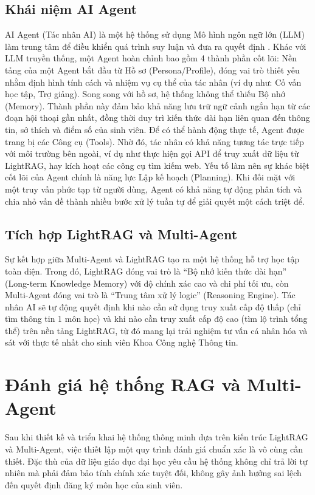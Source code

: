 \subsection{Khái niệm AI Agent}
AI Agent (Tác nhân AI) là một hệ thống sử dụng Mô hình ngôn ngữ lớn (LLM) làm trung tâm để điều khiển quá trình suy luận và đưa ra quyết định \cite{xi2023rise}. Khác với LLM truyền thống, một Agent hoàn chỉnh bao gồm 4 thành phần cốt lõi:
Nền tảng của một Agent bắt đầu từ Hồ sơ (Persona/Profile), đóng vai trò thiết yếu nhằm định hình tính cách và nhiệm vụ cụ thể của tác nhân (ví dụ như: Cố vấn học tập, Trợ giảng).
Song song với hồ sơ, hệ thống không thể thiếu Bộ nhớ (Memory). Thành phần này đảm bảo khả năng lưu trữ ngữ cảnh ngắn hạn từ các đoạn hội thoại gần nhất, đồng thời duy trì kiến thức dài hạn liên quan đến thông tin, sở thích và điểm số của sinh viên.
Để có thể hành động thực tế, Agent được trang bị các Công cụ (Tools). Nhờ đó, tác nhân có khả năng tương tác trực tiếp với môi trường bên ngoài, ví dụ như thực hiện gọi API để truy xuất dữ liệu từ LightRAG, hay kích hoạt các công cụ tìm kiếm web.
Yếu tố làm nên sự khác biệt cốt lõi của Agent chính là năng lực Lập kế hoạch (Planning). Khi đối mặt với một truy vấn phức tạp từ người dùng, Agent có khả năng tự động phân tích và chia nhỏ vấn đề thành nhiều bước xử lý tuần tự để giải quyết một cách triệt để.

\subsection{Tích hợp LightRAG và Multi-Agent}
Sự kết hợp giữa Multi-Agent và LightRAG tạo ra một hệ thống hỗ trợ học tập toàn diện. Trong đó, LightRAG đóng vai trò là ``Bộ nhớ kiến thức dài hạn'' (Long-term Knowledge Memory) với độ chính xác cao và chi phí tối ưu, còn Multi-Agent đóng vai trò là ``Trung tâm xử lý logic'' (Reasoning Engine). Tác nhân AI sẽ tự động quyết định khi nào cần sử dụng truy xuất cấp độ thấp (chỉ tìm thông tin 1 môn học) và khi nào cần truy xuất cấp độ cao (tìm lộ trình tổng thể) trên nền tảng LightRAG, từ đó mang lại trải nghiệm tư vấn cá nhân hóa và sát với thực tế nhất cho sinh viên Khoa Công nghệ Thông tin.

\section{Đánh giá hệ thống RAG và Multi-Agent}
Sau khi thiết kế và triển khai hệ thống thông minh dựa trên kiến trúc LightRAG và Multi-Agent, việc thiết lập một quy trình đánh giá chuẩn xác là vô cùng cần thiết. Đặc thù của dữ liệu giáo dục đại học yêu cầu hệ thống không chỉ trả lời tự nhiên mà phải đảm bảo tính chính xác tuyệt đối, không gây ảnh hưởng sai lệch đến quyết định đăng ký môn học của sinh viên.

